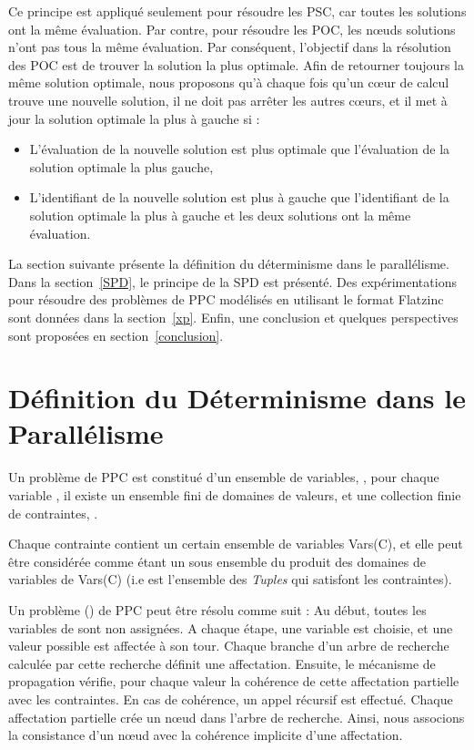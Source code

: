 \documentclass[parallelisme]{compas2014}
\begin{document}
Ce principe est appliqué seulement pour résoudre les PSC, car toutes les solutions ont la même évaluation. Par contre, pour résoudre les POC, les nœuds solutions n'ont pas tous la même évaluation. Par conséquent, l'objectif dans la résolution des POC est de trouver la solution la plus optimale. Afin de retourner toujours la même solution optimale, nous proposons qu'à chaque fois qu'un cœur de calcul trouve une nouvelle solution, il ne doit pas arrêter les autres cœurs, et il met à jour la solution optimale la plus à gauche si :

\begin{itemize}
\item L'évaluation de la nouvelle solution est plus optimale que l'évaluation de la solution optimale la plus gauche,
\item L'identifiant de la nouvelle solution est plus à gauche que l'identifiant de la solution optimale la plus à gauche et les deux solutions ont la même évaluation.
\end{itemize}

La section suivante présente la définition du déterminisme dans le parallélisme. Dans la section~\ref{SPD}, le principe de la SPD est présenté. Des expérimentations pour résoudre des problèmes de PPC modélisés en utilisant le format Flatzinc sont données dans la section~\ref{xp}. Enfin, une conclusion et quelques perspectives sont proposées en section~\ref{conclusion}.
\section{Définition du Déterminisme dans le Parallélisme}\label{de_pa}


Un problème de PPC est constitué d'un ensemble de variables, , pour chaque variable , il existe un ensemble fini de domaines de valeurs,  et une collection finie de contraintes, .

Chaque contrainte  contient un certain ensemble de variables Vars(C), et elle peut être considérée comme étant un sous ensemble du produit des domaines de variables de Vars(C) (i.e  est l'ensemble des \textit{Tuples} qui satisfont les contraintes).

Un problème () de PPC peut être résolu comme suit :
Au début, toutes les variables de  sont non assignées. A chaque étape, une variable  est choisie, et une valeur possible  est affectée à son tour. Chaque branche d'un arbre de recherche calculée par cette recherche définit une affectation. Ensuite, le mécanisme de propagation vérifie, pour chaque valeur la cohérence de cette affectation partielle avec les contraintes. En cas de cohérence, un appel récursif est effectué. Chaque affectation partielle crée un nœud dans l'arbre de recherche. Ainsi, nous associons la consistance d'un nœud avec la cohérence implicite d'une affectation.
\end{document}
